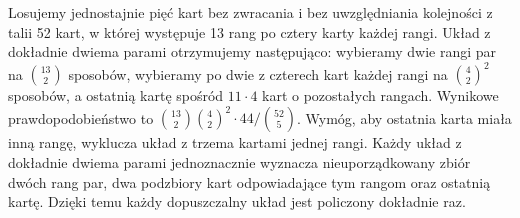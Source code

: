\begin{przyklad}
Losujemy jednostajnie pięć kart bez zwracania i bez uwzględniania
kolejności z talii 52 kart, w której występuje 13 rang
po cztery karty każdej rangi. Układ z dokładnie dwiema parami
otrzymujemy następująco: wybieramy dwie rangi par na $\binom{13}2$
sposobów, wybieramy po dwie z czterech kart każdej rangi
na $\binom42^2$ sposobów, a ostatnią kartę spośród
$11\cdot4$ kart o pozostałych rangach. Wynikowe
prawdopodobieństwo to
$\binom{13}2\binom42^2\cdot44/\binom{52}5$.
Wymóg, aby ostatnia karta miała inną rangę, wyklucza
układ z trzema kartami jednej rangi. Każdy układ z dokładnie
dwiema parami jednoznacznie wyznacza nieuporządkowany zbiór
dwóch rang par, dwa podzbiory kart odpowiadające tym rangom
oraz ostatnią kartę. Dzięki temu każdy dopuszczalny układ
jest policzony dokładnie raz.
\end{przyklad}

